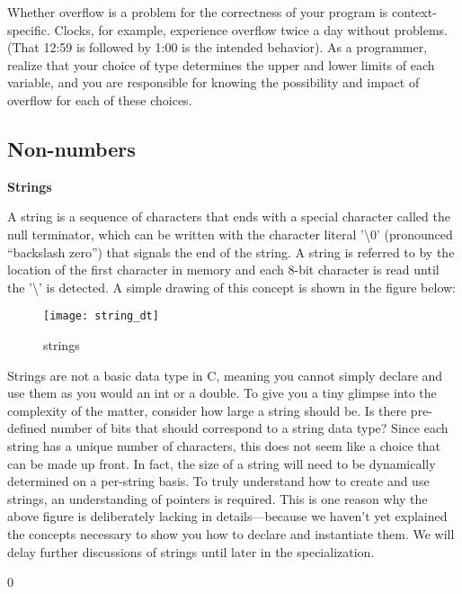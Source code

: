 \documentclass[11pt, a4paper]{article}
\begin{document}
Whether overflow is a problem for the correctness of your program is context-specific. Clocks, for example, experience overflow twice a day without problems. (That 12:59 is followed by 1:00 is the intended behavior). As a programmer, realize that your choice of type determines the upper and lower limits of each variable, and you are responsible for knowing the possibility and impact of overflow for each of these choices.



\subsection{Non-numbers}%
\label{sub:non_numbers}

\textbf{Strings}


A string is a sequence of characters that ends with a special character called the null terminator, which can be written with the character literal '\textbackslash0' (pronounced “backslash zero”) that signals the end of the string. A string is referred to by the location of the first character in memory and each 8-bit character is read until the '\textbackslash' is detected. A simple drawing of this concept is shown in the figure below:



\begin{figure}[htpb]
  \centering
  \texttt{[image: string\_dt]}
  \caption{strings}
  \label{fig:string_dt}
\end{figure}



Strings are not a basic data type in C, meaning you cannot simply declare and use them as you would an int or a double. To give you a tiny glimpse into the complexity of the matter, consider how large a string should be. Is there pre-defined number of bits that should correspond to a string data type? Since each string has a unique number of characters, this does not seem like a choice that can be made up front. In fact, the size of a string will need to be dynamically determined on a per-string basis. To truly understand how to create and use strings, an understanding of pointers is required. This is one reason why the above figure is deliberately lacking in details—because we haven’t yet explained the concepts necessary to show you how to declare and instantiate them. We will delay further discussions of strings until later in the specialization.

0
\end{document}
